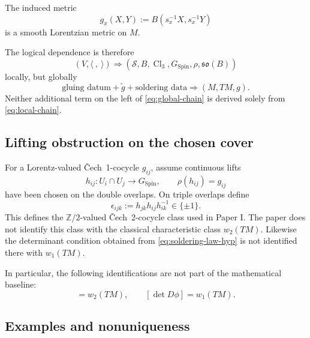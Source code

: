 \documentclass[11pt,a4paper]{article}
\theoremstyle{remark}
\newcommand{\Ztwo}{\mathbb{Z}/2}
\newcommand{\Cl}{\operatorname{Cl}}
\newcommand{\SpinG}{G_{\mathrm{Spin}}}
\newcommand{\Smodel}{\mathcal S}
\newcommand{\soB}{\mathfrak{so}(B)}
\newcommand{\Cech}{\ifmmode\text{\v{C}ech}\else\v{C}ech\fi}
\begin{document}
The induced metric
\begin{equation}
  g_x(X,Y)
  :=B\!\left(s_x^{-1}X,s_x^{-1}Y\right)
\tag{2.18}
\end{equation}
is a smooth Lorentzian metric on \(M\).

The logical dependence is therefore
\begin{equation}
\boxed{
  (V,\langle\ ,\ \rangle)
  \Longrightarrow
  (\Smodel,B,\Cl_3,\SpinG,\rho,\soB)
}
\tag{2.19}\label{eq:local-chain}
\end{equation}
locally, but globally
\begin{equation}
\boxed{
  \text{gluing datum}
  +\widetilde g
  +\text{soldering data}
  \Longrightarrow
  (M,TM,g).
}
\tag{2.20}\label{eq:global-chain}
\end{equation}
Neither additional term on the left of \eqref{eq:global-chain} is derived solely from \eqref{eq:local-chain}.

\subsection{Lifting obstruction on the chosen cover}

For a Lorentz-valued \Cech\ 1-cocycle \(g_{ij}\), assume continuous lifts
\begin{equation}
  h_{ij}:U_i\cap U_j\longrightarrow\SpinG,
  \qquad
  \rho(h_{ij})=g_{ij}
\tag{2.21}
\end{equation}
have been chosen on the double overlaps.  On triple overlaps define
\begin{equation}
  \epsilon_{ijk}
  :=h_{jk}h_{ij}h_{ik}^{-1}
  \in\{\pm1\}.
\tag{2.22}
\end{equation}
This defines the \(\Ztwo\)-valued \Cech\ 2-cocycle class used in Paper I.  The paper does not identify this class with the classical characteristic class \(w_2(TM)\).  Likewise the determinant condition obtained from \eqref{eq:soldering-law-hyp} is not identified there with \(w_1(TM)\).

In particular, the following identifications are not part of the mathematical baseline:
\begin{equation}
  [\epsilon]=w_2(TM),
  \qquad
  [\det D\phi]=w_1(TM).
\tag{2.23}
\end{equation}

\subsection{Examples and nonuniqueness}
\end{document}
